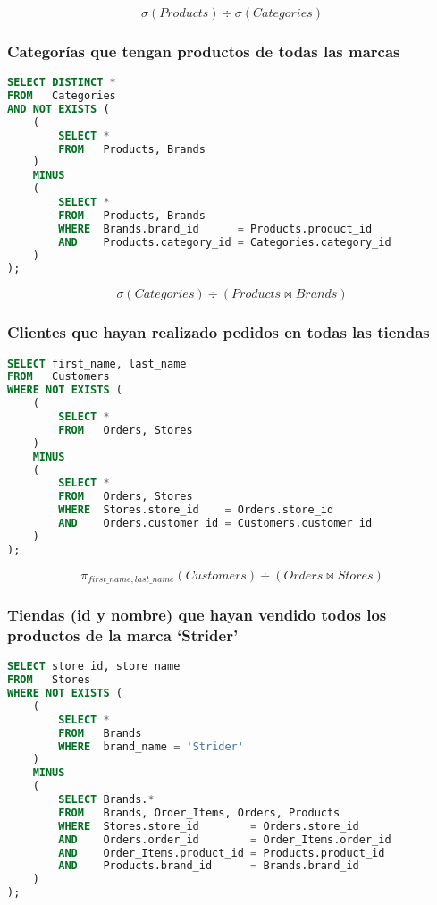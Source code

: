 \[\sigma(Products)\div\sigma(Categories)\]

\pagebreak

\subsubsection{Categorías que tengan productos de todas las marcas}

\begin{lstlisting}[language=SQL]
SELECT DISTINCT *
FROM   Categories
AND NOT EXISTS (
	(
		SELECT *
		FROM   Products, Brands
	)
	MINUS
	(
		SELECT *
		FROM   Products, Brands
		WHERE  Brands.brand_id      = Products.product_id
		AND    Products.category_id = Categories.category_id
	)
);
\end{lstlisting}

\[\sigma(Categories)\div(Products\bowtie Brands)\]

\subsubsection{Clientes que hayan realizado pedidos en todas las tiendas}

\begin{lstlisting}[language=SQL]
SELECT first_name, last_name
FROM   Customers
WHERE NOT EXISTS (
	(
		SELECT *
		FROM   Orders, Stores
	)
	MINUS
	(
		SELECT *
		FROM   Orders, Stores
		WHERE  Stores.store_id    = Orders.store_id
		AND    Orders.customer_id = Customers.customer_id
	)
);
\end{lstlisting}

\[\pi_{first\_name,last\_name}(Customers)\div(Orders\bowtie Stores)\]

\pagebreak

\subsubsection{Tiendas (id y nombre) que hayan vendido todos los productos de la marca `Strider'}

\begin{lstlisting}[language=SQL]
SELECT store_id, store_name
FROM   Stores
WHERE NOT EXISTS (
	(
		SELECT *
		FROM   Brands
		WHERE  brand_name = 'Strider'
	)
	MINUS
	(
		SELECT Brands.*
		FROM   Brands, Order_Items, Orders, Products
		WHERE  Stores.store_id        = Orders.store_id
		AND    Orders.order_id        = Order_Items.order_id
		AND    Order_Items.product_id = Products.product_id
		AND    Products.brand_id      = Brands.brand_id
	)
);
\end{lstlisting}

